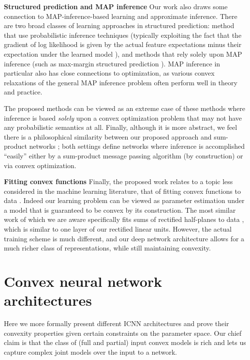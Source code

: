 \textbf{Structured prediction and MAP inference}
Our work also draws some connection to MAP-inference-based learning and
approximate inference.  There are two broad classes of learning approaches in
structured prediction: method that use probabilistic inference techniques
(typically exploiting the fact that the gradient of log likelihood is given by
the actual feature expectations minus their expectation under the learned
model \citep[Ch 20]{koller2009probabilistic}), and methods that rely solely upon
MAP inference (such as max-margin structured prediction
\citep{taskar2005learning,tsochantaridis2005large}).  MAP inference in particular also
has close connections to optimization, as various convex relaxations of the
general MAP inference problem often perform well in theory and practice.

The proposed methods can be viewed as an extreme case of these
methods where inference is based \emph{solely} upon a convex optimization
problem that may not have any probabilistic semantics at all.
Finally, although
it is more abstract, we feel there is a philosophical similarity between our
proposed approach and sum-product networks \citep{poon2011sum}; both settings
define networks where inference is accomplished ``easily'' either by a
sum-product message passing algorithm (by construction) or via convex
optimization.

\textbf{Fitting convex functions}
Finally, the proposed work relates to a
topic less considered in the machine learning literature, that of fitting convex
functions to data \citep[pg. 338]{boyd2004convex}.
Indeed our learning problem can be viewed as
parameter estimation under a model that is guaranteed to be convex by its
construction.  The most similar work of which we
are aware specifically fits sums of rectified half-planes to data
\citep{magnani2009convex}, which
is similar to one layer of our rectified linear units.  However, the actual
training scheme is much different, and our deep network architecture allows for
a much richer class of representations, while still maintaining convexity.



\section{Convex neural network architectures}

Here we more formally present different ICNN architectures and
prove their convexity properties given certain constraints on the parameter
space.  Our chief claim is that the class of (full and partial) input convex
models is rich and lets us capture complex joint models over the input to a
network.

